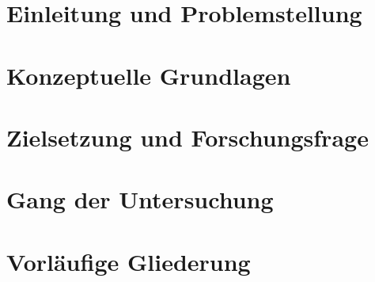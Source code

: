 %
\section{Einleitung und Problemstellung}
\label{sec:einleitung}
%

%
\newpage
%
\section{Konzeptuelle Grundlagen}
\label{sec:grundlagen}

%
\newpage
%
\section{Zielsetzung und Forschungsfrage}
\label{sec:zielsetzung-forschungsfrage}
%

%
\newpage
%
\section{Gang der Untersuchung}
\label{sec:gang-der-untersuchung}
%

%
\newpage
%
\section{Vorläufige Gliederung}
\label{sec:gliederung}
%
